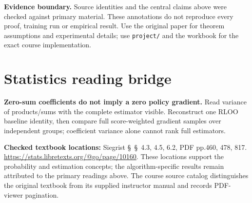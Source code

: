 \documentclass[11pt]{scrartcl}
\begin{document}
\noindent\textbf{Evidence boundary.} Source identities and the central claims above were checked against primary material. These annotations do not reproduce every proof, training run or empirical result. Use the original paper for theorem assumptions and experimental details; use \texttt{project/} and the workbook for the exact course implementation.
\section*{Statistics reading bridge}
\textbf{Zero-sum coefficients do not imply a zero policy gradient.} Read variance of products/sums with the complete estimator visible. Reconstruct one RLOO baseline identity, then compare full score-weighted gradient samples over independent groups; coefficient variance alone cannot rank full estimators.

\textbf{Checked textbook locations:} Siegrist \S~\S~4.3, 4.5, 6.2, PDF pp.460, 478, 817. \url{https://stats.libretexts.org/@go/page/10160}. These locations support the probability and estimation concepts; the algorithm-specific results remain attributed to the primary readings above. The course source catalog distinguishes the original textbook from its supplied instructor manual and records PDF-viewer pagination.
\end{document}
